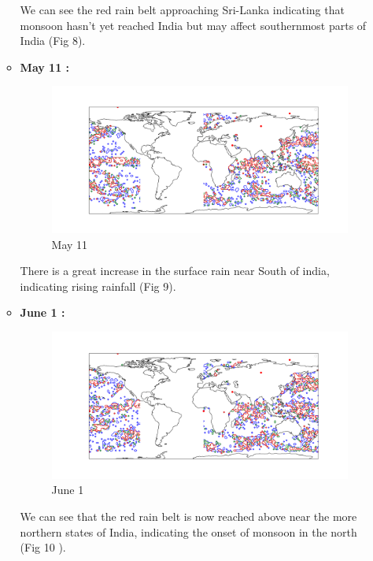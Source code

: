 \documentclass[conference]{IEEEtran}
\begin{document}
\begin{enumerate}
\begin{itemize}
    We can see the red rain belt approaching Sri-Lanka indicating that monsoon hasn't yet reached India but may affect southernmost parts of India (Fig 8).

    \item \textbf{May 11 :} 

     \begin{figure}
         \centering
         \includegraphics[width=1\linewidth]{May11.png}
         \caption{May 11}
         \label{fig:enter-label}
     \end{figure}
    
    There is a great increase in the surface rain near South of india, indicating rising rainfall (Fig 9).

    \item \textbf{June 1 :} 
    
    \begin{figure}
        \centering
        \includegraphics[width=1\linewidth]{Jun1.png}
        \caption{June 1}
        \label{fig:enter-label}
    \end{figure}
    
    We can see that the red rain belt is now reached above near the more northern states of India, indicating the onset of monsoon in the north (Fig 10 ).


\end{itemize}
\end{enumerate}
\end{document}
